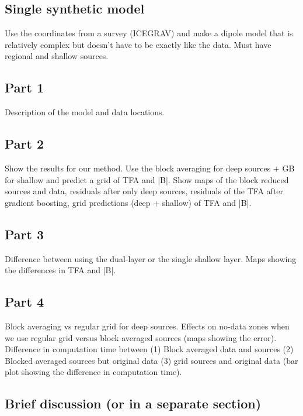 \subsection{Single synthetic model}
Use the coordinates from a survey (ICEGRAV) and make a dipole model that is relatively complex but doesn't have to be exactly like the data. Must have regional and shallow sources.


\subsection{Part 1}
Description of the model and data locations.

\subsection{Part 2}
Show the results for our method. Use the block averaging for deep sources + GB for shallow and predict a grid of TFA and |B|. Show maps of the block reduced sources and data, residuals after only deep sources, residuals of the TFA after gradient boosting, grid predictions (deep + shallow) of TFA and |B|.

\subsection{Part 3}
Difference between using the dual-layer or the single shallow layer. Maps showing the differences in TFA and |B|.

\subsection{Part 4}
Block averaging vs regular grid for deep sources. Effects on no-data zones when we use regular grid versus block averaged sources (maps showing the error). Difference in computation time between (1) Block averaged data and sources (2) Blocked averaged sources but original data (3) grid sources and original data (bar plot showing the difference in computation time).

\subsection{Brief discussion (or in a separate section)}



